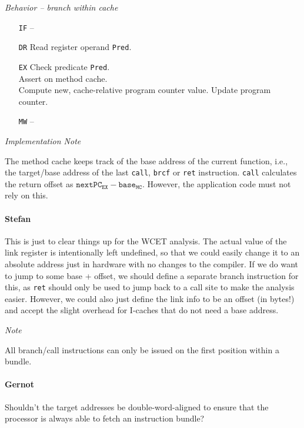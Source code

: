 \documentclass{IEEEtran}
\newcommand{\comment}[3]{\paragraph*{\textbf{#1}}{\color{#3}#2}}
\newcommand{\martin}[1]{\comment{Martin}{#1}{Blue}}
\newcommand{\stefan}[1]{\comment{Stefan}{#1}{RoyalPurple}}
\newcommand{\daniel}[1]{\comment{Daniel}{#1}{RoyalBlue}}
\newcommand{\gebhard}[1]{\comment{Gernot}{#1}{RedOrange}}
\begin{document}
\vspace{7mm}
\emph{Behavior -- branch within cache}
\begin{itemize}
  \item[\texttt{IF}] --
  \item[\texttt{DR}] Read register operand \texttt{Pred}.
  \item[\texttt{EX}] Check predicate \texttt{Pred}. \\
                     Assert on method cache. \\
                     Compute new, cache-relative program counter value.
                     Update program counter.
  \item[\texttt{MW}] --
\end{itemize}

\vspace{7mm}


\emph{Implementation Note}

The method cache keeps track of the base address of the current function, i.e., 
the target/base address of the last \texttt{call}, \texttt{brcf} or \texttt{ret} instruction.
\texttt{call} calculates the return offset as $\texttt{nextPC}_\texttt{EX} - \texttt{base}_\texttt{MC}$. 
However, the application code must not rely on this.

\stefan{This is just to clear things up for the WCET analysis. The actual value of the
link register is intentionally left undefined, so that we could easily change it to an
absolute address just in hardware with no changes to the compiler. If we do want to jump to 
some base + offset, we should define a separate branch instruction for this, as \texttt{ret}
should only be used to jump back to a call site to make the analysis easier. However, we could
also just define the link info to be an offset (in bytes!) and accept the slight overhead for I-caches that
do not need a base address.}

\emph{Note}

All branch/call instructions can only be issued on the first position within a
bundle.

\gebhard{Shouldn't the target addresses be double-word-aligned to ensure that the processor is always able to fetch an instruction bundle?}
\end{document}
